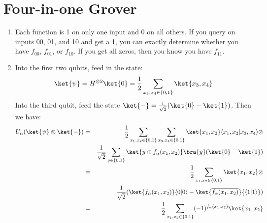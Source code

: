 \documentclass[12pt]{article}
\begin{document}
\newcommand{\braket}[2]{\langle #1|#2 \rangle}
\newcommand{\normtwo}{\frac{1}{\sqrt{2}}}

\section{Four-in-one Grover}

\begin{enumerate}

\item %
Each function is 1 on only one input and 0 on all others.
If you query on inputs 00, 01, and 10 and get a 1,
you can exactly determine whether you have $f_{00}$, $f_{01}$, or $f_{10}$.
If you get all zeros, then you know you have $f_{11}$.

\item %
Into the first two qubits, feed in the state:
\begin{displaymath}
\ket{\psi} = H^{\otimes 2}\ket{0} = \frac{1}{2}\sum_{x_3,x_4 \in \{0,1\}}\ket{x_3,x_4}
\end{displaymath}
Into the third qubit, feed the state $\ket{-}=\normtwo(\ket{0}-\ket{1})$.
Then we have:
\begin{eqnarray*}
U_{\alpha}(\ket{\psi}\otimes\ket{-}) & = &
\frac{1}{2}\sum_{x_1,x_2 \in \{0,1\}}\sum_{x_3,x_4 \in \{0,1\}}
\ket{x_1,x_2}\braket{x_1,x_2}{x_3,x_4} \otimes\\
& & \normtwo \sum_{y \in \{0,1\}}
\ket{y \oplus f_{\alpha}(x_1,x_2)}\bra{y}(\ket{0}-\ket{1})\\
& = & \frac{1}{2}\sum_{x_1,x_2 \in \{0,1\}}\ket{x_1,x_2} \otimes\\
& & \normtwo (\ket{f_{\alpha}(x_1,x_2)}\braket{0}{0} - \ket{\overline{f_{\alpha}(x_1,x_2)}}{\braket{1}{1}})\\
& = & \frac{1}{2}\sum_{x_1,x_2 \in \{0,1\}}(-1)^{f_\alpha(x_1,x_2)}\ket{x_1,x_2}
\end{eqnarray*}


\end{enumerate}
\end{document}
